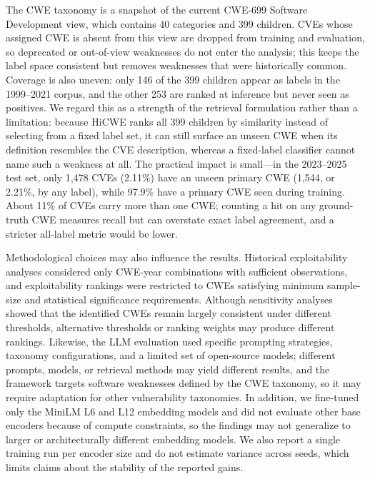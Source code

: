 \documentclass[conference,compsoc]{IEEEtran}
\begin{document}
The CWE taxonomy is a snapshot of the current CWE-699 Software Development view, which contains 40 categories and 399 children. CVEs whose assigned CWE is absent from this view are dropped from training and evaluation, so deprecated or out-of-view weaknesses do not enter the analysis; this keeps the label space consistent but removes weaknesses that were historically common. Coverage is also uneven: only 146 of the 399 children appear as labels in the 1999--2021 corpus, and the other 253 are ranked at inference but never seen as positives. We regard this as a strength of the retrieval formulation rather than a limitation: because HiCWE ranks all 399 children by similarity instead of selecting from a fixed label set, it can still surface an unseen CWE when its definition resembles the CVE description, whereas a fixed-label classifier cannot name such a weakness at all. The practical impact is small---in the 2023--2025 test set, only 1,478 CVEs (2.11\%) have an unseen primary CWE (1,544, or 2.21\%, by any label), while 97.9\% have a primary CWE seen during training. About 11\% of CVEs carry more than one CWE; counting a hit on any ground-truth CWE measures recall but can overstate exact label agreement, and a stricter all-label metric would be lower.

Methodological choices may also influence the results. Historical exploitability analyses considered only CWE-year combinations with sufficient observations, and exploitability rankings were restricted to CWEs satisfying minimum sample-size and statistical significance requirements. Although sensitivity analyses showed that the identified CWEs remain largely consistent under different thresholds, alternative thresholds or ranking weights may produce different rankings. Likewise, the LLM evaluation used specific prompting strategies, taxonomy configurations, and a limited set of open-source models; different prompts, models, or retrieval methods may yield different results, and the framework targets software weaknesses defined by the CWE taxonomy, so it may require adaptation for other vulnerability taxonomies. In addition, we fine-tuned only the MiniLM L6 and L12 embedding models and did not evaluate other base encoders because of compute constraints, so the findings may not generalize to larger or architecturally different embedding models. We also report a single training run per encoder size and do not estimate variance across seeds, which limits claims about the stability of the reported gains.
\end{document}
